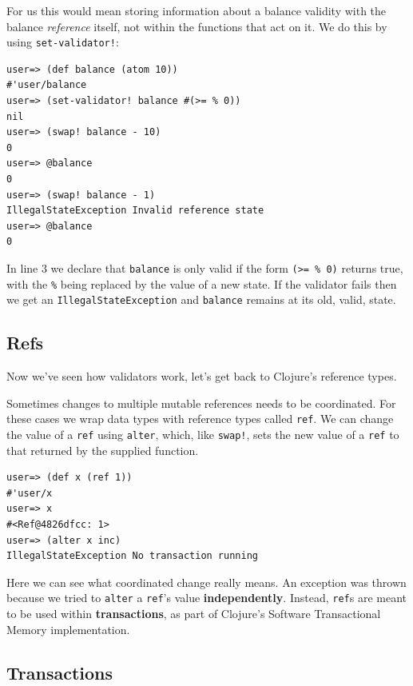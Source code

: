 \documentclass[a4paper,12pt]{kth-mag}
\begin{document}
For us this would mean storing information about a balance validity with the balance \textit{reference} itself, not within the functions that act on it. We do this by using \texttt{set-validator!}:

\begin{listing}[H]
	\begin{verbatim}
user=> (def balance (atom 10))
#'user/balance
user=> (set-validator! balance #(>= % 0)) 
nil
user=> (swap! balance - 10)
0
user=> @balance
0
user=> (swap! balance - 1)
IllegalStateException Invalid reference state
user=> @balance
0
	\end{verbatim}
\end{listing}

In line 3 we declare that \texttt{balance} is only valid if the form \texttt{(>= \% 0)} returns true, with the \texttt{\%} being replaced by  the value of a new state. If the validator fails then we get an \texttt{IllegalStateException} and \texttt{balance} remains at its old, valid, state.

\subsection{Refs}

Now we've seen how validators work, let's get back to Clojure's reference types.

Sometimes changes to multiple mutable references needs to be coordinated. For these cases we wrap data types with reference types called \texttt{ref}. We can change the value of a \texttt{ref} using \texttt{alter}, which, like \texttt{swap!}, sets the new value of a \texttt{ref} to that returned by the supplied function. 

\begin{listing}[H]
	\begin{verbatim}
user=> (def x (ref 1))
#'user/x
user=> x
#<Ref@4826dfcc: 1>
user=> (alter x inc)
IllegalStateException No transaction running
	\end{verbatim}
\end{listing}

Here we can see what coordinated change really means. An exception was thrown because we tried to \texttt{alter} a \texttt{ref}'s value \textbf{independently}. Instead, \texttt{ref}s are meant to be used within \textbf{transactions}, as part of Clojure's Software Transactional Memory implementation. 

\subsection{Transactions}
\end{document}
